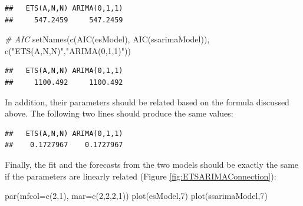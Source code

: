 \documentclass[
]{book}
\newenvironment{Shaded}{\begin{snugshade}}{\end{snugshade}}
\newcommand{\AttributeTok}[1]{\textcolor[rgb]{0.77,0.63,0.00}{#1}}
\newcommand{\CommentTok}[1]{\textcolor[rgb]{0.56,0.35,0.01}{\textit{#1}}}
\newcommand{\DecValTok}[1]{\textcolor[rgb]{0.00,0.00,0.81}{#1}}
\newcommand{\FunctionTok}[1]{\textcolor[rgb]{0.00,0.00,0.00}{#1}}
\newcommand{\NormalTok}[1]{#1}
\newcommand{\SpecialCharTok}[1]{\textcolor[rgb]{0.00,0.00,0.00}{#1}}
\newcommand{\StringTok}[1]{\textcolor[rgb]{0.31,0.60,0.02}{#1}}
\theoremstyle{definition}
\theoremstyle{definition}
\theoremstyle{definition}
\theoremstyle{definition}
\theoremstyle{remark}
\begin{document}
\begin{verbatim}
##   ETS(A,N,N) ARIMA(0,1,1) 
##     547.2459     547.2459
\end{verbatim}

\begin{Shaded}
\begin{Highlighting}[]
\CommentTok{\# AIC}
\FunctionTok{setNames}\NormalTok{(}\FunctionTok{c}\NormalTok{(}\FunctionTok{AIC}\NormalTok{(esModel), }\FunctionTok{AIC}\NormalTok{(ssarimaModel)),}
         \FunctionTok{c}\NormalTok{(}\StringTok{"ETS(A,N,N)"}\NormalTok{,}\StringTok{"ARIMA(0,1,1)"}\NormalTok{))}
\end{Highlighting}
\end{Shaded}

\begin{verbatim}
##   ETS(A,N,N) ARIMA(0,1,1) 
##     1100.492     1100.492
\end{verbatim}

In addition, their parameters should be related based on the formula discussed above. The following two lines should produce the same values:

\begin{Shaded}
\end{Shaded}

\begin{verbatim}
##   ETS(A,N,N) ARIMA(0,1,1) 
##    0.1727967    0.1727967
\end{verbatim}

Finally, the fit and the forecasts from the two models should be exactly the same if the parameters are linearly related (Figure \ref{fig:ETSARIMAConnection}):

\begin{Shaded}
\begin{Highlighting}[]
\FunctionTok{par}\NormalTok{(}\AttributeTok{mfcol=}\FunctionTok{c}\NormalTok{(}\DecValTok{2}\NormalTok{,}\DecValTok{1}\NormalTok{), }\AttributeTok{mar=}\FunctionTok{c}\NormalTok{(}\DecValTok{2}\NormalTok{,}\DecValTok{2}\NormalTok{,}\DecValTok{2}\NormalTok{,}\DecValTok{1}\NormalTok{))}
\FunctionTok{plot}\NormalTok{(esModel,}\DecValTok{7}\NormalTok{)}
\FunctionTok{plot}\NormalTok{(ssarimaModel,}\DecValTok{7}\NormalTok{)}
\end{Highlighting}
\end{Shaded}
\end{document}
